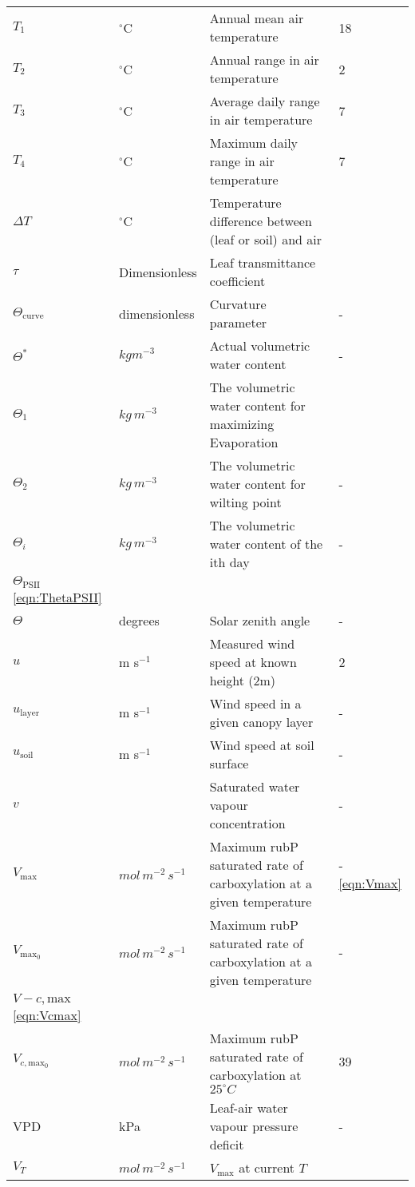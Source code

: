 \documentclass[10pt]{article}
\renewcommand{\marginnote}[2][]{}
\begin{document}
\begin{center}
\begin{longtable}{l l p{3in} p{0.5in}}
$T_1$	&	$^\circ$C	&	Annual mean air temperature	&	18	\\
$T_2$	&	$^\circ$C	&	Annual range in air temperature	&	2	\\
$T_3$	&	$^\circ$C	&	Average daily range in air temperature	&	7	\\
$T_4$	&	$^\circ$C	&	Maximum daily range in air temperature	&	7	\\
$\Delta T$ &	$^\circ$C& Temperature difference between (leaf or soil) and air &\\
$\tau$	&	Dimensionless 	&	Leaf transmittance coefficient	&		\\
$\Theta_{\text{curve}}$	&	dimensionless	&	Curvature parameter	&	-	\\
$\Theta^{*}$	&	$kg m^{-3}$	&	Actual volumetric water content	&	-	\\
$\Theta_1$	&	$kg\, m^{-3}$	&	The volumetric water content for maximizing Evaporation	&		\\
$\Theta_2$	&	$kg\, m^{-3}$	&	The volumetric water content for wilting point	&	-	\\
$\Theta_i$	&	$kg\, m^{-3}$	&	The volumetric water content of the ith day	&	-	\\
$\Theta_\text{PSII}$\ref{eqn:ThetaPSII}\marginnote{undefined}\\
$\Theta$	&	degrees	&	Solar zenith angle	&	-	\\
$u$	&	m s$^{-1}$	&	Measured wind speed at known height (2m)	&	2	\\
$u_{\text{layer}}$	&	m s$^{-1}$ 	&	Wind speed in a given canopy layer	&	-	\\
$u_{\text{soil}}$	&	m s$^{-1}$ 	&	Wind speed at soil surface	&	-	\\
$v$	&		&	Saturated water vapour concentration 	&	-	\\
$V_{\text{max}}$	&	$mol\, m^{-2}\, s^{-1}$ 	&	Maximum rubP saturated rate of carboxylation at a given temperature	&	-	\ref{eqn:Vmax}\\
$V_{\text{max}_0}$	&	$mol\, m^{-2}\, s^{-1}$ 	&	Maximum rubP saturated rate of carboxylation at a given temperature	&	-	\\
$V-{c,\text{max}}$\ref{eqn:Vcmax}\marginnote{undefined}\\
$V_{c,\text{max}_0}$	&	$mol\, m^{-2}\, s^{-1}$ 	&	Maximum rubP saturated rate of carboxylation at $25^\circ C$	&	39	\\
VPD	&	kPa	&	Leaf-air water vapour pressure deficit	&	-	\\
$V_T$ & $mol\, m^{-2}\, s^{-1}$  &$V_\text{max}$ at current $T$ & \\

\end{longtable}
\end{center}
\end{document}
